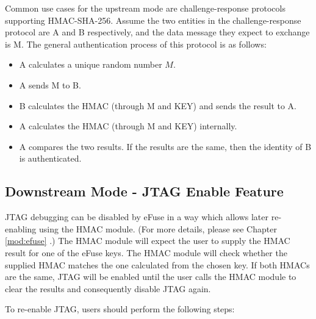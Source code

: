 \documentclass[main\_\_EN.tex]{subfiles}
\begin{document}
\begin{tiplisting}
Common use cases for the upstream mode are challenge-response protocols supporting HMAC-SHA-256. Assume the two entities in the challenge-response protocol are A and B respectively, and the data message they expect to exchange is M. The general authentication process of this protocol is as follows:

\begin{itemize}
    \item A calculates a unique random number $M$.
    \item A sends M to B.
    \item B calculates the HMAC (through M and KEY) and sends the result to A.
    \item A calculates the HMAC (through M and KEY) internally.
    \item A compares the two results. If the results are the same, then the identity of B is authenticated.
\end{itemize}
\end{tiplisting}

\subsection{Downstream Mode - JTAG Enable Feature}

JTAG debugging can be disabled by eFuse in a way which allows later re-enabling using the HMAC module. (For more details, please see Chapter \ref{mod:efuse} \textit{}.) The HMAC module will expect the user to supply the HMAC result for one of the eFuse keys. The HMAC module will check whether the supplied HMAC matches the one calculated from the chosen key. If both HMACs are the same, JTAG will be enabled until the user calls the HMAC module to clear the results and consequently disable JTAG again.

To re-enable JTAG, users should perform the following steps:
\end{document}
